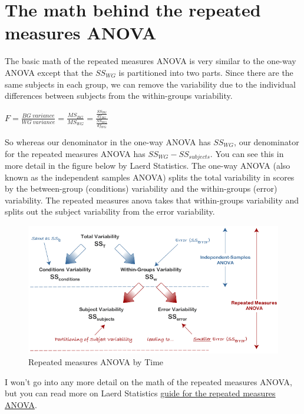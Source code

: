 \documentclass[
]{book}
\begin{document}
\hypertarget{the-math-behind-the-repeated-measures-anova}{%
\section{The math behind the repeated measures ANOVA}\label{the-math-behind-the-repeated-measures-anova}}

The basic math of the repeated measures ANOVA is very similar to the one-way ANOVA except that the \(SS_{WG}\) is partitioned into two parts. Since there are the same subjects in each group, we can remove the variability due to the individual differences between subjects from the within-groups variability.

\(F = \frac{BG \:variance}{WG \:variance} = \frac{MS_{BG}}{MS_{WG}} = \frac{\frac{SS_{BG}}{df_{BG}}}{\frac{SS_{WG}}{df_{WG}}}\)

So whereas our denominator in the one-way ANOVA has \(SS_{WG}\), our denominator for the repeated measures ANOVA has \(SS_{WG}-SS_{subjects}\). You can see this in more detail in the figure below by Laerd Statistics. The one-way ANOVA (also known as the independent samples ANOVA) splits the total variability in scores by the between-group (conditions) variability and the within-groups (error) variability. The repeated measures anova takes that within-groups variability and splits out the subject variability from the error variability.

\begin{figure}

{\centering \includegraphics[width=0.8\linewidth]{images/05-repeated-measures-anova/Laerd3} 

}

\caption{Repeated measures ANOVA by Time}\label{fig:unnamed-chunk-3}
\end{figure}

I won't go into any more detail on the math of the repeated measures ANOVA, but you can read more on Laerd Statistics \href{https://statistics.laerd.com/statistical-guides/repeated-measures-anova-statistical-guide-2.php}{guide for the repeated measures ANOVA}.
\end{document}
